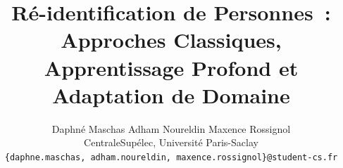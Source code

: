 \documentclass[10pt,twocolumn,letterpaper]{article}
\title{Ré-identification de Personnes~: Approches Classiques,\\
Apprentissage Profond et Adaptation de Domaine}
\author{
Daphné Maschas \quad Adham Noureldin \quad Maxence Rossignol \\
CentraleSupélec, Université Paris-Saclay \\
{\tt\small \{daphne.maschas, adham.noureldin, maxence.rossignol\}@student-cs.fr}
}
\begin{document}
\maketitle






{
    \small
    
    
}
\end{document}
